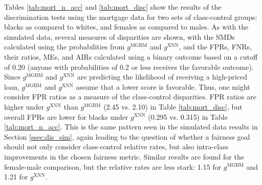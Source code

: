 \documentclass[information,article,submit,moreauthors,pdftex]{definitions/mdpi}
\begin{document}
Tables \ref{tab:mort_n_acc} and \ref{tab:mort_disc} show the results of the discrimination tests using the mortgage data for two sets of class-control groups: blacks as compared to whites, and females as compared to males. As with the simulated data, several measures of disparities are shown, with the SMDs calculated using the probabilities from $g^{\text{MGBM}}$ and $g^{\text{XNN}}$, and the FPRs, FNRs, their ratios, MEs, and AIRs calculated using a binary outcome based on a cutoff of 0.20 (anyone with probabilities of 0.2 or less receives the favorable outcome).  Since $g^{\text{MGBM}}$ and $g^{\text{XNN}}$  are predicting the likelihood of receiving a high-priced loan, $g^{\text{MGBM}}$ and $g^{\text{XNN}}$ assume that a lower score is favorable.  Thus, one might consider FPR ratios as a measure of the class-control disparities.  FPR ratios are higher under $g^{\text{XNN}}$ than $g^{\text{MGBM}}$ (2.45 vs. 2.10) in Table \ref{tab:mort_disc},  but overall FPRs are lower for blacks under $g^{\text{XNN}}$ (0.295 vs. 0.315) in Table \ref{tab:mort_n_acc}.  This is the same pattern seen in the simulated data results in Section \ref{ssec:dis_sim}, again leading to the question of whether a fairness goal should not only consider class-control relative rates, but also intra-class improvements in the chosen fairness metric.  Similar results are found for the female-male comparison, but the relative rates are less stark: 1.15 for $g^{\text{MGBM}}$ and 1.21 for $g^{\text{XNN}}$.
\end{document}
